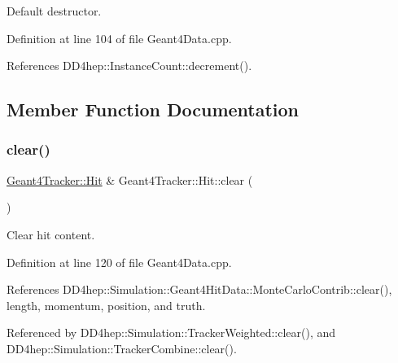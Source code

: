 Default destructor. 



Definition at line 104 of file Geant4\+Data.\+cpp.



References D\+D4hep\+::\+Instance\+Count\+::decrement().



\subsection{Member Function Documentation}
\hypertarget{class_d_d4hep_1_1_simulation_1_1_geant4_tracker_1_1_hit_aafcd9c0b786c16d9db3de2de661c9200}{}\label{class_d_d4hep_1_1_simulation_1_1_geant4_tracker_1_1_hit_aafcd9c0b786c16d9db3de2de661c9200} 
\subsubsection{\texorpdfstring{clear()}{clear()}}
{\footnotesize\ttfamily \hyperlink{class_d_d4hep_1_1_simulation_1_1_geant4_tracker_1_1_hit}{Geant4\+Tracker\+::\+Hit} \& Geant4\+Tracker\+::\+Hit\+::clear (\begin{DoxyParamCaption}{ }\end{DoxyParamCaption})}



Clear hit content. 



Definition at line 120 of file Geant4\+Data.\+cpp.



References D\+D4hep\+::\+Simulation\+::\+Geant4\+Hit\+Data\+::\+Monte\+Carlo\+Contrib\+::clear(), length, momentum, position, and truth.



Referenced by D\+D4hep\+::\+Simulation\+::\+Tracker\+Weighted\+::clear(), and D\+D4hep\+::\+Simulation\+::\+Tracker\+Combine\+::clear().

\hypertarget{class_d_d4hep_1_1_simulation_1_1_geant4_tracker_1_1_hit_a97a85ebcb7994f55275d4479ca5c4a6a}{}\label{class_d_d4hep_1_1_simulation_1_1_geant4_tracker_1_1_hit_a97a85ebcb7994f55275d4479ca5c4a6a} 
